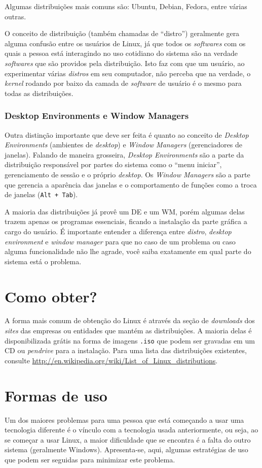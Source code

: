 \documentclass{handout_utfpr}
\begin{document}
Algumas distribuições mais comuns são: Ubuntu, Debian, Fedora, entre várias outras.

O conceito de distribuição (também chamadas de ``distro'') geralmente gera alguma confusão entre os usuários de Linux, já que todos os \textit{softwares} com os quais a pessoa está interagindo no uso cotidiano do sistema são na verdade \textit{softwares} que são providos pela distribuição. Isto faz com que um usuário, ao experimentar várias \textit{distros} em seu computador, não perceba que na verdade, o \textit{kernel} rodando por baixo da camada de \textit{software} de usuário é o mesmo para todas as distribuições.

\subsubsection{Desktop Environments e Window Managers}
Outra distinção importante que deve ser feita é quanto ao conceito de \textit{Desktop Environments} (ambientes de \textit{desktop}) e \textit{Window Managers} (gerenciadores de janelas). Falando de maneira grosseira, \textit{Desktop Environments} são a parte da distribuição responsável por partes do sistema como o ``menu iniciar'', gerenciamento de sessão e o próprio \textit{desktop}. Os \textit{Window Managers} são a parte que gerencia a aparência das janelas e o comportamento de funções como a troca de janelas (\texttt{Alt + Tab}).

A maioria das distribuições já provê um DE e um WM, porém algumas delas trazem apenas os programas essenciais, ficando a instalação da parte gráfica a cargo do usuário. É importante entender a diferença entre \textit{distro}, \textit{desktop environment} e \textit{window manager} para que no caso de um problema ou caso alguma funcionalidade não lhe agrade, você saiba exatamente em qual parte do sistema está o problema.

\section{Como obter?}
A forma mais comum de obtenção do Linux é através da seção de \textit{downloads} dos \textit{sites} das empresas ou entidades que mantém as distribuições. A maioria delas é disponibilizada grátis na forma de imagens \texttt{.iso} que podem ser gravadas em um CD ou \textit{pendrive} para a instalação. Para uma lista das distribuições existentes, consulte \url{http://en.wikipedia.org/wiki/List_of_Linux_distributions}.
  
\section{Formas de uso}
Um dos maiores problemas para uma pessoa que está começando a usar uma tecnologia diferente é o vínculo com a tecnologia usada anteriormente, ou seja, ao se começar a usar Linux, a maior dificuldade que se encontra é a falta do outro sistema (geralmente Windows). Apresenta-se, aqui, algumas estratégias de uso que podem ser seguidas para minimizar este problema.
\end{document}
